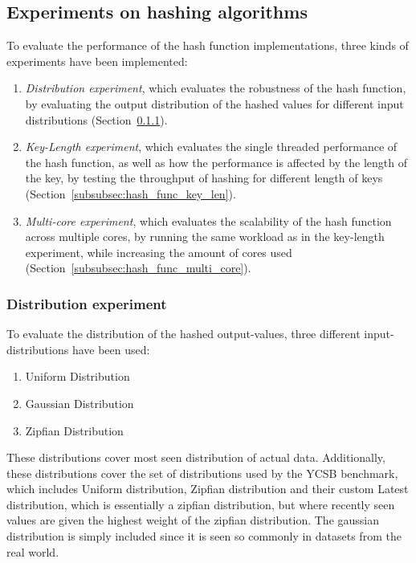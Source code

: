 \documentclass[11pt]{article} %
\begin{document}
\subsection{Experiments on hashing algorithms}
\label{subsec:hash_func_experiments}
To evaluate the performance of the hash function implementations, three kinds of experiments have been implemented:
\begin{enumerate}[noitemsep]
  \item \emph{Distribution experiment}, which evaluates the robustness of the hash function, by evaluating the output distribution of the hashed values for different input distributions (Section~\ref{subsubsec:hash_func_dist}). 
  \item \emph{Key-Length experiment}, which evaluates the single threaded performance of the hash function, as well as how the performance is affected by the length of the key, by testing the throughput of hashing for different length of keys (Section~\ref{subsubsec:hash_func_key_len}).
  \item \emph{Multi-core experiment}, which evaluates the scalability of the hash function across multiple cores, by running the same workload as in the key-length experiment, while increasing the amount of cores used (Section~\ref{subsubsec:hash_func_multi_core}). 
\end{enumerate}

\subsubsection{Distribution experiment}
\label{subsubsec:hash_func_dist}
To evaluate the distribution of the hashed output-values, three different input-distributions have been used:
\begin{enumerate}[noitemsep]
  \item Uniform Distribution
  \item Gaussian Distribution
  \item Zipfian Distribution
\end{enumerate}

These distributions cover most seen distribution of actual data. Additionally, these distributions cover the set of distributions used by the YCSB benchmark, which includes Uniform distribution, Zipfian distribution and their custom Latest distribution, which is essentially a zipfian distribution, but where recently seen values are given the highest weight of the zipfian distribution. The gaussian distribution is simply included since it is seen so commonly in datasets from the real world.\\
\end{document}

